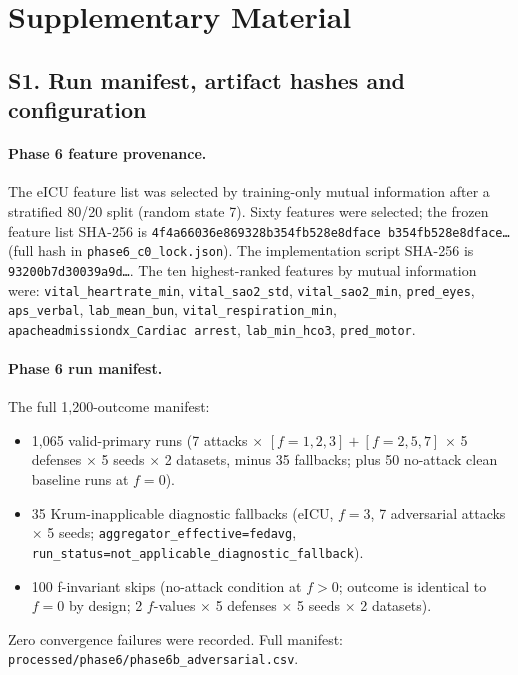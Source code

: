 
\section*{Supplementary Material}

\subsection*{S1. Run manifest, artifact hashes and configuration}

\paragraph{Phase 6 feature provenance.}
The eICU feature list was selected by training-only mutual information
after a stratified 80/20 split (random state 7).
Sixty features were selected; the frozen feature list
SHA-256 is \texttt{4f4a66036e869328b354fb528e8dface\allowbreak
b354fb528e8dface\ldots} (full hash in \texttt{phase6\_c0\_lock.json}).
The implementation script SHA-256 is \texttt{93200b7d30039a9d\ldots}.
The ten highest-ranked features by mutual information were:
\texttt{vital\_heartrate\_min},
\texttt{vital\_sao2\_std},
\texttt{vital\_sao2\_min},
\texttt{pred\_eyes},
\texttt{aps\_verbal},
\texttt{lab\_mean\_bun},
\texttt{vital\_respiration\_min},
\texttt{apacheadmissiondx\_Cardiac arrest},
\texttt{lab\_min\_hco3},
\texttt{pred\_motor}.

\paragraph{Phase 6 run manifest.}
The full 1,200-outcome manifest:
\begin{itemize}
  \item 1,065 valid-primary runs
    (7 attacks $\times$ $[f=1,2,3] + [f=2,5,7]$ $\times$ 5 defenses
    $\times$ 5 seeds $\times$ 2 datasets, minus 35 fallbacks;
    plus 50 no-attack clean baseline runs at $f=0$).
  \item 35 Krum-inapplicable diagnostic fallbacks
    (eICU, $f=3$, 7 adversarial attacks $\times$ 5 seeds;
    \texttt{aggregator\_effective=fedavg},
    \texttt{run\_status=not\_applicable\_diagnostic\_fallback}).
  \item 100 f-invariant skips
    (no-attack condition at $f>0$; outcome is identical to $f=0$
    by design; 2 $f$-values $\times$ 5 defenses $\times$ 5 seeds
    $\times$ 2 datasets).
\end{itemize}
Zero convergence failures were recorded.
Full manifest: \texttt{processed/phase6/phase6b\_adversarial.csv}.

